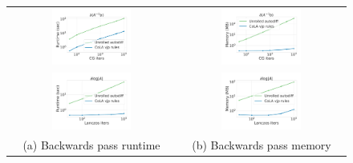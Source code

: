 \documentclass{article}
\begin{document}
\begin{figure}
    \centering
    \begin{tabular}{cc}
    \includegraphics[width=0.5\textwidth]{./figs/trace_runtime.pdf}
      &
    \hspace{-2em}
    \includegraphics[width=0.5\textwidth]{./figs/trace_memory.pdf}
    \\
    \includegraphics[width=0.5\textwidth]{./figs/trace_runtime_slq.pdf}
      &
    \hspace{-2em}
    \includegraphics[width=0.5\textwidth]{./figs/trace_memory_slq.pdf}
    \\
    (a) Backwards pass runtime & (b) Backwards pass memory

\end{tabular}
\end{figure}
\end{document}
